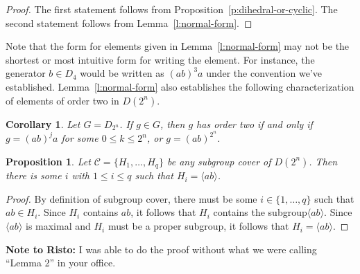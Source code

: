 \documentclass{amsart}
\numberwithin{equation} {section}
\newtheorem{proposition}[equation]{Proposition}
\newtheorem{corollary}[equation]{Corollary}
\theoremstyle{definition}
\begin{document}
\begin{proof}
The first statement follows from Proposition~\ref{p:dihedral-or-cyclic}. The second statement follows from Lemma~\ref{l:normal-form}. 
\end{proof} 

Note that the form for elements given in Lemma~\ref{l:normal-form} may not be the shortest or most intuitive form for writing the element. For instance, the generator $b \in D_4$ would be written as $(ab)^3a$ under the convention we've established. Lemma~\ref{l:normal-form} also establishes the following characterization of elements of order two in $D(2^n)$. 

\begin{corollary}\label{c:elements-of-order-two}
Let $G = D_{2^n}$. If $g \in G$, then $g$ has order two if and only if $g = (ab)^ja$ for some $0 \leq k \leq 2^n$, or $g = (ab)^{2^n}$. 
\end{corollary} 

\begin{proposition}\label{p:subgroup-cover-must-contain-maximal-cyclic}
Let $\mathcal{C} = \{H_1, \ldots, H_q \}$ be any subgroup cover of $D(2^n)$. Then there is some $i$ with $1 \leq i \leq q$ such that $H_i = \langle ab \rangle$.
\end{proposition}

\begin{proof}
By definition of subgroup cover, there must be some $i \in \{1,\ldots, q\}$ such that $ab\in H_i$. Since $H_i$ contains $ab$, it follows that $H_i$ contains the subgroup$\langle ab \rangle$. Since $\langle ab \rangle$ is maximal and $H_i$ must be a proper subgroup, it follows that $H_i = \langle ab \rangle$. 
\end{proof}

\textbf{Note to Risto:} I was able to do the proof without what we were calling ``Lemma 2'' in your office. 

\begin{comment}
This was originally included as a Lemma, but I no longer feel it is necessary. 

\begin{proposition}\label{p:how-to-cover-reflections}
Le $B = \{(ab)^ja \mid 0 \leq j \leq 2^{n-1} \}$. Let $\mathcal{C}$ be a collection of subgroups of $D(2^n)$. Then $\mathcal{C}$ is a minimal powerful subgroup cover of $B$ if and only if removing the subgroup $\langle ab \rangle$ from $C$ results in a minimal powerful subgroup cover of $D(2^n)$. 
\end{proposition}

\begin{proof}
todo. 
\end{proof}
\end{comment}
\end{document}
